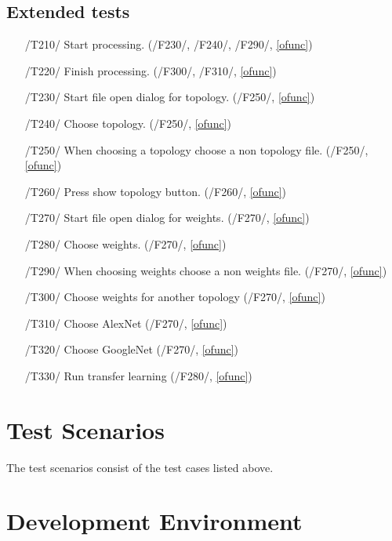 \documentclass[parskip=full]{scrartcl}
\begin{document}
\pagebreak



\subsection {Extended tests}

\begin{itemize}
	\item[/T210/] Start processing. (/F230/, /F240/, /F290/, \ref{ofunc})
	\item[/T220/] Finish processing. (/F300/, /F310/, \ref{ofunc})
	\item[/T230/] Start file open dialog for topology. (/F250/, \ref{ofunc})
	\item[/T240/] Choose topology. (/F250/, \ref{ofunc})
	\item[/T250/] When choosing a topology choose a non topology file. (/F250/, \ref{ofunc})
	\item[/T260/] Press show topology button. (/F260/, \ref{ofunc})
	\item[/T270/] Start file open dialog for weights. (/F270/, \ref{ofunc})
	\item[/T280/] Choose weights. (/F270/, \ref{ofunc})
	\item[/T290/] When choosing weights choose a non weights file. (/F270/, \ref{ofunc})
	\item[/T300/] Choose weights for another topology (/F270/, \ref{ofunc})
	\item[/T310/] Choose AlexNet (/F270/, \ref{ofunc})
	\item[/T320/] Choose GoogleNet (/F270/, \ref{ofunc})
	\item[/T330/] Run transfer learning (/F280/, \ref{ofunc})
\end{itemize}

\pagebreak





\section{Test Scenarios}

The test scenarios consist of the test cases listed above.

\pagebreak





\section{Development Environment}
\end{document}
